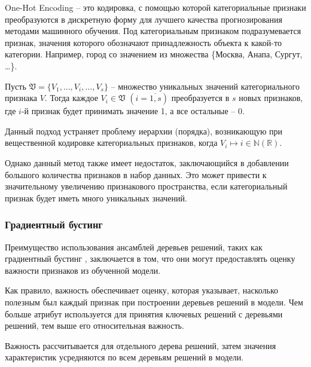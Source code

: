 \documentclass[12pt]{article}
\begin{document}
    \par One-Hot Encoding -- это кодировка, с помощью которой категориальные признаки преобразуются в дискретную форму для лучшего качества прогнозирования методами машинного обучения. Под категориальным признаком подразумевается признак, значения которого обозначают принадлежность объекта к какой-то категории. Например, город со значением из множества \{Москва, Анапа, Сургут, \ldots\}.

    \par Пусть $ \mathfrak{V} = \{V_1, \ldots, V_i, \ldots, V_s\} $ -- множество уникальных значений категориального признака $V$. Тогда каждое $V_i \in \mathfrak{V}$ $(i = \overline{1,s})$ преобразуется в $s$ новых признаков, где $i$-й признак будет принимать значение 1, а все остальные -- 0.


    \par Данный подход устраняет проблему иерархии (порядка), возникающую при вещественной кодировке категориальных признаков, когда $V_i \mapsto i \in \mathbb{N}(\mathbb{R})$.

    \par Однако данный метод также имеет недостаток, заключающийся в добавлении большого количества признаков в набор данных. Это может привести к значительному увеличению признакового пространства, если категориальный признак будет иметь много уникальных значений.




    \subsubsection{Градиентный бустинг}
    \label{sec:Research:FeatureSpace:GradientBoostingClassifier}

    \par Преимущество использования ансамблей деревьев решений, таких как градиентный бустинг \cite{GBM}, заключается в том, что они могут предоставлять оценку важности признаков из обученной модели.

    \par Как правило, важность обеспечивает оценку, которая указывает, насколько полезным был каждый признак при построении деревьев решений в модели. Чем больше атрибут используется для принятия ключевых решений с деревьями решений, тем выше его относительная важность.

    \par Важность рассчитывается для отдельного дерева решений, затем значения характеристик усредняются по всем деревьям решений в модели.
\end{document}
